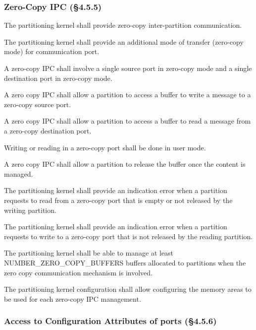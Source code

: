 \subsubsection{Zero-Copy IPC (\S4.5.5)}

The partitioning kernel shall provide zero-copy inter-partition communication.

The partitioning kernel shall provide an additional mode of transfer (zero-copy mode) for communication port.

A zero-copy IPC shall involve a single source port in zero-copy mode and a single destination port in zero-copy mode.

A zero copy IPC shall allow a partition to access a buffer to write a message to a zero-copy source port.

A zero copy IPC shall allow a partition to access a buffer to read a message from a zero-copy destination port.

Writing or reading in a zero-copy port shall be done in user mode.

A zero copy IPC shall allow a partition to release the buffer once the content is managed.

The partitioning kernel shall provide an indication error when a partition requests to read from a zero-copy port that is empty or not released by the writing partition.

The partitioning kernel shall provide an indication error when a partition requests to write to a zero-copy port that is not released by the reading partition.

The partitioning kernel shall be able to manage at least NUMBER\_ZERO\_COPY\_BUFFERS buffers allocated to partitions when the zero copy communication mechanism is involved.

The partitioning kernel configuration shall allow configuring the memory areas to be used for each zero-copy IPC management.

\subsubsection{Access to Configuration Attributes of ports (\S4.5.6)}

